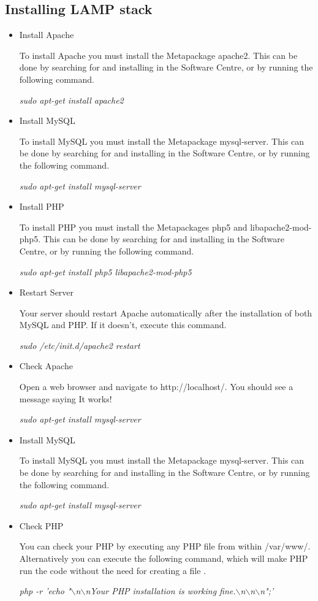 \documentclass{article}
\begin{document}
\subsection{Installing LAMP stack}
\begin{itemize}
\item Install Apache

To install Apache you must install the Metapackage apache2. This can be done by searching for and installing in the Software Centre, or by running the following command.

\textit{sudo apt-get install apache2}

\item Install MySQL

To install MySQL you must install the Metapackage mysql-server. This can be done by searching for and installing in the Software Centre, or by running the following command.

\textit{sudo apt-get install mysql-server}

\item Install PHP

To install PHP you must install the Metapackages php5 and libapache2-mod-php5. This can be done by searching for and installing in the Software Centre, or by running the following command.

\textit{sudo apt-get install php5 libapache2-mod-php5}

\item  Restart Server

Your server should restart Apache automatically after the installation of both MySQL and PHP. If it doesn't, execute this command.

\textit{sudo /etc/init.d/apache2 restart}

\item Check Apache

Open a web browser and navigate to http://localhost/. You should see a message saying It works!

\textit{sudo apt-get install mysql-server}

\item Install MySQL

To install MySQL you must install the Metapackage mysql-server. This can be done by searching for and installing in the Software Centre, or by running the following command.

\textit{sudo apt-get install mysql-server}

\item Check PHP

You can check your PHP by executing any PHP file from within /var/www/. Alternatively you can execute the following command, which will make PHP run the code without the need for creating a file .

\textit{php -r 'echo "$\backslash$n$\backslash$nYour PHP installation is working fine.$\backslash$n$\backslash$n$\backslash$n";'}

 
\end{itemize}
\end{document}

